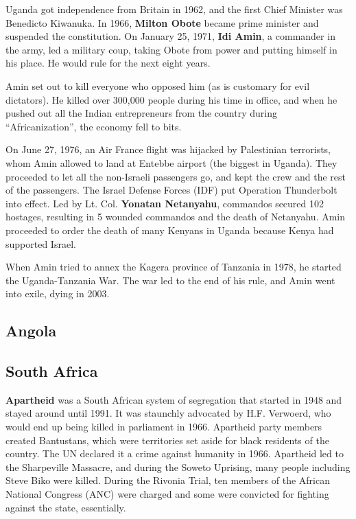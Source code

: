 Uganda got independence from Britain in 1962, and the first Chief Minister was Benedicto Kiwanuka.
In 1966, \textbf{Milton Obote} became prime minister and suspended the constitution.
On January 25, 1971, \textbf{Idi Amin}, a commander in the army, led a military coup,
taking Obote from power and putting himself in his place.
He would rule for the next eight years.

Amin set out to kill everyone who opposed him (as is customary for evil dictators).
He killed over 300,000 people during his time in office,
and when he pushed out all the Indian entrepreneurs from the country during ``Africanization'',
the economy fell to bits.

On June 27, 1976, an Air France flight was hijacked by Palestinian terrorists,
whom Amin allowed to land at Entebbe airport (the biggest in Uganda).
They proceeded to let all the non-Israeli passengers go, and kept the crew and the rest of the passengers.
The Israel Defense Forces (IDF) put Operation Thunderbolt into effect.
Led by Lt. Col. \textbf{Yonatan Netanyahu}, commandos secured 102 hostages,
resulting in 5 wounded commandos and the death of Netanyahu.
Amin proceeded to order the death of many Kenyans in Uganda because Kenya had supported Israel.

When Amin tried to annex the Kagera province of Tanzania in 1978, he started the Uganda-Tanzania War.
The war led to the end of his rule, and Amin went into exile, dying in 2003.

\subsection*{Angola}

\subsection*{South Africa}

\textbf{Apartheid} was a South African system of segregation that started in 1948 and stayed around until 1991.
It was staunchly advocated by H.F. Verwoerd, who would end up being killed in parliament in 1966.
Apartheid party members created Bantustans, which were territories set aside for black residents of the country.
The UN declared it a crime against humanity in 1966.
Apartheid led to the Sharpeville Massacre,
and during the Soweto Uprising, many people including Steve Biko were killed.
During the Rivonia Trial, ten members of the African National Congress (ANC) were charged and some were convicted
for fighting against the state, essentially.

